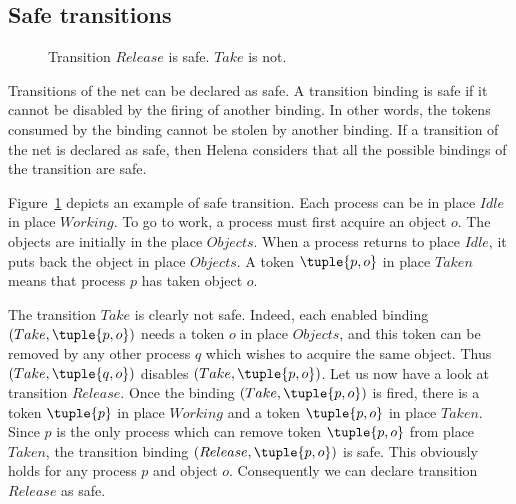 \subsection{Safe transitions}

\begin{figure}[!h]
\centerline{\scalebox{0.55}{}}
\caption{Transition $Release$ is safe. $Take$ is not.}
\label{fig_safe}
\end{figure}
Transitions of the net can be declared as safe.  A transition binding
is safe if it cannot be disabled by the firing of another binding.  In
other words, the tokens consumed by the binding cannot be stolen by
another binding.  If a transition of the net is declared as safe, then
Helena considers that all the possible bindings of the transition are
safe.

Figure~\ref{fig_safe} depicts an example of safe transition.  Each
process can be in place $Idle$ in place $Working$.  To go to work, a
process must first acquire an object $o$.  The objects are initially
in the place $Objects$.  When a process returns to place $Idle$, it
puts back the object in place $Objects$.  A token $\tuple{p,o}$ in
place $Taken$ means that process $p$ has taken object $o$.

The transition $Take$ is clearly not safe.  Indeed, each enabled
binding $(Take,\tuple{p,o})$ needs a token $o$ in place $Objects$, and
this token can be removed by any other process $q$ which wishes to
acquire the same object.  Thus $(Take,\tuple{q,o})$ disables
$(Take,\tuple{p,o})$.  Let us now have a look at transition $Release$.
Once the binding $(Take,\tuple{p,o})$ is fired, there is a token
$\tuple{p}$ in place $Working$ and a token $\tuple{p,o}$ in place
$Taken$.  Since $p$ is the only process which can remove token
$\tuple{p,o}$ from place $Taken$, the transition binding
$(Release,\tuple{p,o})$ is safe.  This obviously holds for any process
$p$ and object $o$.  Consequently we can declare transition $Release$
as safe.
